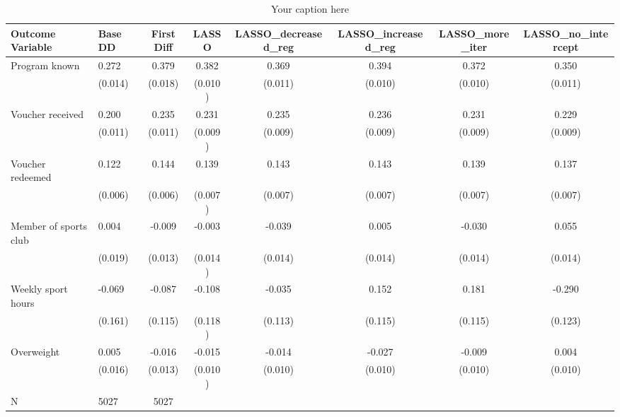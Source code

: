 \begin{sidewaystable*}
\centering
\begin{tabular}{llcccccc}
\hline
Outcome Variable & Base DD & First Diff & LASSO & LASSO_decreased_reg & LASSO_increased_reg & LASSO_more_iter & LASSO_no_intercept \\
\hline
Program known & 0.272 & 0.379 & 0.382 & 0.369 & 0.394 & 0.372 & 0.350 \\
  & (0.014) & (0.018) & (0.010) & (0.011) & (0.010) & (0.010) & (0.011) \\
Voucher received & 0.200 & 0.235 & 0.231 & 0.235 & 0.236 & 0.231 & 0.229 \\
  & (0.011) & (0.011) & (0.009) & (0.009) & (0.009) & (0.009) & (0.009) \\
Voucher redeemed & 0.122 & 0.144 & 0.139 & 0.143 & 0.143 & 0.139 & 0.137 \\
  & (0.006) & (0.006) & (0.007) & (0.007) & (0.007) & (0.007) & (0.007) \\
Member of sports club & 0.004 & -0.009 & -0.003 & -0.039 & 0.005 & -0.030 & 0.055 \\
  & (0.019) & (0.013) & (0.014) & (0.014) & (0.014) & (0.014) & (0.014) \\
Weekly sport hours & -0.069 & -0.087 & -0.108 & -0.035 & 0.152 & 0.181 & -0.290 \\
  & (0.161) & (0.115) & (0.118) & (0.113) & (0.115) & (0.115) & (0.123) \\
Overweight & 0.005 & -0.016 & -0.015 & -0.014 & -0.027 & -0.009 & 0.004 \\
  & (0.016) & (0.013) & (0.010) & (0.010) & (0.010) & (0.010) & (0.010) \\
\hline
N & 5027 & 5027  &  &  &  &  \\
\hline
\end{tabular}
\caption{Your caption here}
\label{tab:your_label}
\end{sidewaystable*}